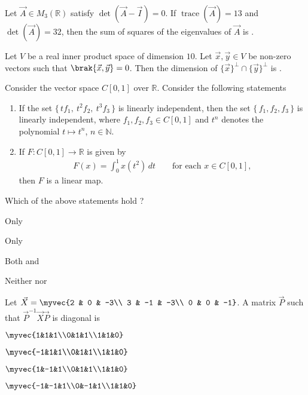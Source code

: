 \item Let $\vec{A}\in M_{3}(\mathbb{R})$ satisfy $\det(\vec{A}-\vec{I})=0$. If $\operatorname{trace}(\vec{A})=13$ and
$\det(\vec{A})=32$, then the sum of squares of the eigenvalues of $\vec{A}$ is
\underline{\hspace{2.5cm}}.
\hfill{}
\item Let $V$ be a real inner product space of dimension $10$.
Let $\vec{x},\vec{y}\in V$ be non-zero vectors such that $\brak{\vec{x},\vec{y}}=0$.
Then the dimension of $\{\vec{x}\}^{\perp}\cap\{\vec{y}\}^{\perp}$ is \underline{\hspace{1cm}}.
\hfill{}
\item Consider the vector space $C[0,1]$ over $\mathbb{R}$.  Consider the following statements
	\begin{enumerate}[label=(\Alph*), start=16]
\item If the set $\{\,t f_1,\ t^{2} f_2,\ t^{3} f_3\,\}$ is linearly independent, then the set
$\{\,f_1,f_2,f_3\,\}$ is linearly independent, where $f_1,f_2,f_3\in C[0,1]$ and $t^{n}$ denotes the
polynomial $t\mapsto t^{n}$, $n\in\mathbb{N}$.
\item If $F:C[0,1]\to\mathbb{R}$ is given by
\begin{align*}
F(x)=\int_{0}^{1} x(t^{2})\,dt\qquad\text{for each }x\in C[0,1],
\end{align*}
then $F$ is a linear map.
\end{enumerate}
Which of the above statements hold ?
\hfill{}
\begin{enumerate}
\begin{multicols}{4}
\item Only 
\item Only 
\item Both  and 
\item Neither  nor 
\end{multicols}
\end{enumerate}
\item Let
$\vec{X}=\myvec
{2 & 0 & -3\\
3 & -1 & -3\\
0 & 0 & -1}$.
A matrix $\vec{P}$ such that $\vec{P}^{-1}\vec{X}\vec{P}$ is diagonal is \hfill{}
\begin{enumerate}
\begin{multicols}{4}
\item $\myvec{1&1&1\\0&1&1\\1&1&0}$
\item $\myvec{-1&1&1\\0&1&1\\1&1&0}$
\item $\myvec{1&-1&1\\0&1&1\\1&1&0}$
\item $\myvec{-1&-1&1\\0&-1&1\\1&1&0}$
\end{multicols}
\end{enumerate}

